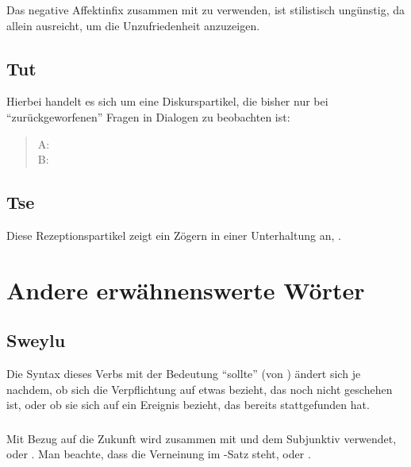 Das negative Affektinfix  zusammen mit  zu verwenden, ist stilistisch ungünstig, da  allein ausreicht, um die Unzufriedenheit anzuzeigen. 

\subsection{Tut} Hierbei handelt es sich um eine Diskurspartikel, die bisher nur bei ``zurückgeworfenen'' Fragen in Dialogen zu beobachten ist: 

\begin{quotation}
	\noindent A:   \\
	\noindent B:  
\end{quotation}

\subsection{Tse} Diese Rezeptionspartikel zeigt ein Zögern in einer Unterhaltung an, . 

\section{Andere erwähnenswerte Wörter}

\subsection{Sweylu} \label{syn:sweylu} Die Syntax dieses Verbs mit der Bedeutung ``sollte'' (von  ) ändert sich je nachdem, ob sich die Verpflichtung auf etwas bezieht, das noch nicht geschehen ist, oder ob sie sich auf ein Ereignis bezieht, das bereits stattgefunden hat.

\subsubsection{} Mit Bezug auf die Zukunft wird  zusammen mit  und dem Subjunktiv verwendet,  oder  . Man beachte, dass die Verneinung im -Satz steht,  oder  .

